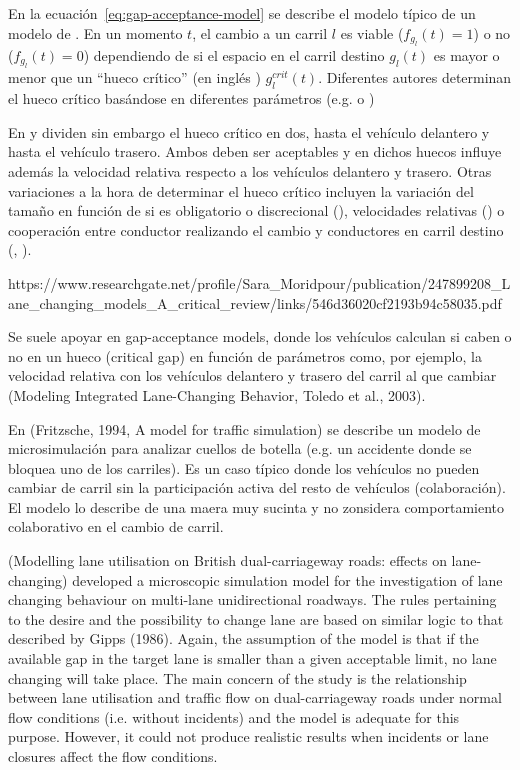 En la ecuación~\ref{eq:gap-acceptance-model} se describe el modelo típico de un modelo de . En un momento $t$, el cambio a un carril $l$ es viable ($f_{g_l}(t) = 1$) o no ($f_{g_l}(t) = 0$) dependiendo de si el espacio en el carril destino $g_l(t)$ es mayor o menor que un \enquote{hueco crítico} (en inglés ) $g^{crit}_l(t)$. Diferentes autores determinan el hueco crítico basándose en diferentes parámetros (e.g. \cite{Miller1972} o \cite{Cassidy1995})

En \cite{Gipps1986} y \cite{Ahmed1996} dividen sin embargo el hueco crítico en dos, hasta el vehículo delantero y hasta el vehículo trasero. Ambos deben ser aceptables y en dichos huecos influye además la velocidad relativa respecto a los vehículos delantero y trasero. Otras variaciones a la hora de determinar el hueco crítico incluyen la variación del tamaño en función de si es obligatorio o discrecional (\cite{Toledo2003}), velocidades relativas (\cite{Ahmed1999}) o cooperación entre conductor realizando el cambio y conductores en carril destino (\cite{Ahmed1999}, \cite{Hidas2002}).

https://www.researchgate.net/profile/Sara\_Moridpour/publication/247899208\_Lane\_changing\_models\_A\_critical\_review/links/546d36020cf2193b94c58035.pdf

Se suele apoyar en gap-acceptance models, donde los vehículos calculan si caben o no en un hueco (critical gap) en función de parámetros como, por ejemplo, la velocidad relativa con los vehículos delantero y trasero del carril al que cambiar (Modeling Integrated Lane-Changing Behavior, Toledo et al., 2003).



En (Fritzsche, 1994, A model for traffic simulation) se describe un modelo de microsimulación para analizar cuellos de botella (e.g. un accidente donde se bloquea uno de los carriles). Es un caso típico donde los vehículos no pueden cambiar de carril sin la participación activa del resto de vehículos (colaboración). El modelo lo describe de una maera muy sucinta y no zonsidera comportamiento colaborativo en el cambio de carril.

(Modelling lane utilisation on British dual-carriageway roads: effects on lane-changing) developed a microscopic simulation model for the investigation of lane changing behaviour on multi-lane unidirectional roadways. The rules pertaining to the desire and the possibility to change lane are based on similar logic to that described by Gipps (1986). Again, the assumption of the model is that if the available gap in the target lane is smaller than a given acceptable limit, no lane changing will take place. The main concern of the study is the relationship between lane utilisation and traffic flow on dual-carriageway roads under normal flow conditions (i.e. without incidents) and the model is adequate for this purpose. However, it could not produce realistic results when incidents or lane closures affect the flow conditions.

